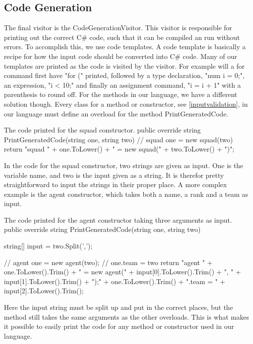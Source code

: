 \subsection{Code Generation}
The final visitor is the CodeGenerationVisitor. 
This visitor is responsible for printing out the correct C\# code, such that it can be compiled an run without errors. 
To accomplish this, we use code templates. \newline
A code template is basically a recipe for how the input code should be converted into C\# code. 
Many of our templates are printed as the code is visited by the visitor. 
For example will a for command first have "for (" printed, followed by a type declaration, "num i = 0;", an expression, "i < 10;" and finally an assignment command, "i = i + 1" with a parenthesis to round off. \newline
For the methods in our language, we have a different solution though. 
Every class for a method or constructor, see \ref{inputvalidation}, in our language must define an overload for the method PrintGeneratedCode. 

\begin{source}{The code printed for the squad constructor.}{}
public override string PrintGeneratedCode(string one, string two)
        {
            // squad one = new squad(two)
            return "squad " + one.ToLower() + " = new squad(" + two.ToLower() + ")";
        }
\end{source}

In the code for the squad constructor, two strings are given as input. 
One is the variable name, and two is the input given as a string. 
It is therefor pretty straightforward to input the strings in their proper place. 
A more complex example is the agent constructor, which takes both a name, a rank and a team as input.

\begin{source}{The code printed for the agent constructor taking three arguments as input.}{}
public override string PrintGeneratedCode(string one, string two)
        {
            string[] input = two.Split(',');
						
            // agent one = new agent(two);
            // one.team = two
            return "agent " + one.ToLower().Trim() + 
							" = new agent(" + input[0].ToLower().Trim() + 
							", " + input[1].ToLower().Trim() + ");\n" + 
							one.ToLower().Trim() + ".team = " + 
							input[2].ToLower().Trim();
        }
\end{source}

Here the input string must be split up and put in the correct places, but the method still takes the same arguments as the other overloads. 
This is what makes it possible to easily print the code for any method or constructor used in our language.